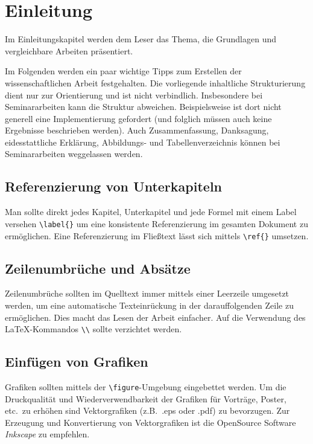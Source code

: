 \chapter{Einleitung}
\label{ch:einleitung}

Im Einleitungskapitel werden dem Leser das Thema, die Grundlagen und vergleichbare Arbeiten präsentiert.

Im Folgenden werden ein paar wichtige Tipps zum Erstellen der wissenschaftlichen Arbeit festgehalten. Die vorliegende inhaltliche Strukturierung dient nur zur Orientierung und ist nicht verbindlich. Insbesondere bei Seminararbeiten kann die Struktur abweichen. Beispielsweise ist dort nicht generell eine Implementierung gefordert (und folglich müssen auch keine Ergebnisse beschrieben werden). Auch Zusammenfassung, Danksagung, eidesstattliche Erklärung, Abbildungs- und Tabellenverzeichnis können bei Seminararbeiten weggelassen werden.


\section{Referenzierung von Unterkapiteln}
\label{s:ref} 
Man sollte direkt jedes Kapitel, Unterkapitel und jede Formel mit einem Label versehen \verb+\label{}+ um eine konsistente Referenzierung im gesamten Dokument zu ermöglichen. Eine Referenzierung im Fließtext lässt sich mittels \verb+\ref{}+ umsetzen.


\section{Zeilenumbrüche und Absätze}
\label{s:zeilenumbruch} 
Zeilenumbrüche sollten im Quelltext immer mittels einer Leerzeile umgesetzt werden, um eine automatische Texteinrückung in der darauffolgenden Zeile zu ermöglichen. Dies macht das Lesen der Arbeit einfacher. Auf die Verwendung des LaTeX-Kommandos \verb+\\+ sollte verzichtet werden.


\section{Einfügen von Grafiken}
\label{s:grafik} 
Grafiken sollten mittels der \verb+\figure+-Umgebung eingebettet werden. Um die Druckqualität und Wiederverwendbarkeit der Grafiken für Vorträge, Poster, etc.\ zu erhöhen sind Vektorgrafiken (z.B.\ .eps oder .pdf) zu bevorzugen. Zur Erzeugung und Konvertierung von Vektorgrafiken ist die OpenSource Software \emph{Inkscape} zu empfehlen.

